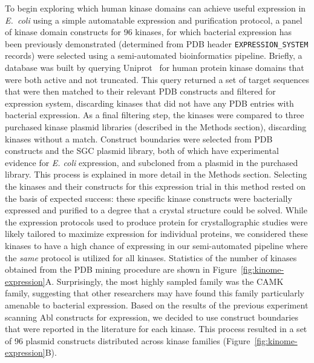 \documentclass[9pt,lineno]{elife}
\begin{document}
To begin exploring which human kinase domains can achieve useful expression in \emph{E.~coli} using a simple automatable expression and purification protocol, a panel of kinase domain constructs for 96 kinases, for which bacterial expression has been previously demonstrated (determined from PDB header {\tt EXPRESSION\_SYSTEM} records) were selected using a semi-automated bioinformatics pipeline. 
Briefly, a database was built by querying Uniprot~\citep{uniprot:2017} for human protein kinase domains that were both active and not truncated. 
This query returned a set of target sequences that were then matched to their relevant PDB constructs and filtered for expression system, discarding kinases that did not have any PDB entries with bacterial expression. 
As a final filtering step, the kinases were compared to three purchased kinase plasmid libraries (described in the Methods section), discarding kinases without a match. Construct boundaries were selected from PDB constructs and the SGC plasmid library, both of which have experimental evidence for \emph{E. coli} expression, and subcloned from a plasmid in the purchased library. This process is explained in more detail in the Methods section. 
Selecting the kinases and their constructs for this expression trial in this method rested on the basis of expected success: these specific kinase constructs were bacterially expressed and purified to a degree that a crystal structure could be solved. 
While the expression protocols used to produce protein for crystallographic studies were likely tailored to maximize expression for individual proteins, we considered these kinases to have a high chance of expressing in our semi-automated pipeline where the \emph{same} protocol is utilized for all kinases. 
Statistics of the number of kinases obtained from the PDB mining procedure are shown in Figure~\ref{fig:kinome-expression}A. 
Surprisingly, the most highly sampled family was the CAMK family, suggesting that other researchers may have found this family particularly amenable to bacterial expression.
Based on the results of the previous experiment scanning Abl constructs for expression, we decided to use construct boundaries that were reported in the literature for each kinase. 
This process resulted in a set of 96 plasmid constructs distributed across kinase families (Figure~\ref{fig:kinome-expression}B). 
\end{document}

